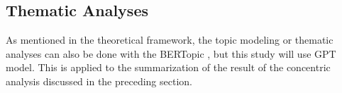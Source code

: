 \subsection{Thematic Analyses}
As mentioned in the theoretical framework, the topic modeling or thematic analyses can also be done with the BERTopic , but this study will use GPT \cite{radford2018improving} model. This is applied to the summarization of the result of the concentric analysis discussed in the preceding section.